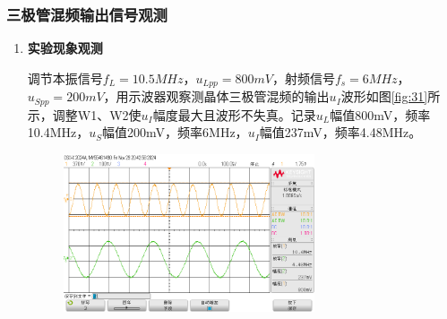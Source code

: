 \documentclass[UTF8]{ctexart}
\begin{document}
\subsubsection{三极管混频输出信号观测}
\begin{enumerate}
    \item \textbf{实验现象观测}

    调节本振信号$f_L=10.5MHz$，$u_{Lpp}=800mV$，射频信号$f_s=6MHz$，$u_{Spp}=200mV$，用示波器观察测晶体三极管混频的输出$u_I$波形如图\ref{fig:31}所示，调整W1、W2使$u_I$幅度最大且波形不失真。记录$u_L$幅值800mV，频率10.4MHz，$u_S$幅值200mV，频率6MHz，$u_I$幅值237mV，频率4.48MHz。
    \begin{figure}[H]
        \centering
        \includegraphics[width=0.7\textwidth]{pics/31.png}


\end{figure}
\end{enumerate}
\end{document}
